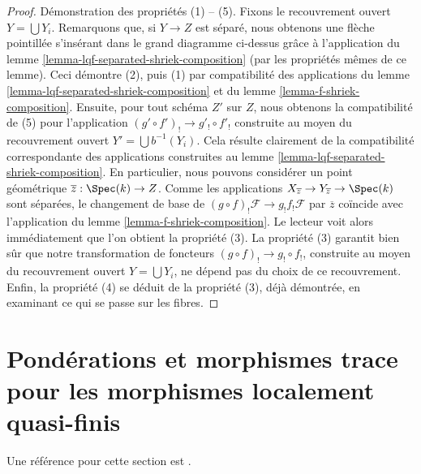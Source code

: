 \begin{proof}
\medskip\noindent
Démonstration des propriétés (1) -- (5). Fixons le recouvrement ouvert $Y = \bigcup Y_i$.
Remarquons que, si $Y \to Z$ est séparé, nous obtenons une flèche pointillée
s'insérant dans le grand diagramme ci-dessus grâce à l'application du
lemme \ref{lemma-lqf-separated-shriek-composition}
(par les propriétés mêmes de ce lemme).
Ceci démontre (2), puis (1) par compatibilité des
applications du lemme \ref{lemma-lqf-separated-shriek-composition}
et du lemme \ref{lemma-f-shriek-composition}.
Ensuite, pour tout schéma $Z'$ sur $Z$, nous obtenons la compatibilité de (5)
pour l'application $(g' \circ f')_! \to g'_! \circ f'_!$
construite au moyen du recouvrement ouvert $Y' = \bigcup b^{-1}(Y_i)$.
Cela résulte clairement de la compatibilité correspondante des applications
construites au lemme \ref{lemma-lqf-separated-shriek-composition}.
En particulier, nous pouvons considérer un point géométrique
$\overline{z} : \Spec(k) \to Z$. Comme les applications
$X_{\overline{z}} \to Y_{\overline{z}} \to \Spec(k)$
sont séparées, le changement de base de
$(g \circ f)_!\mathcal{F} \to g_! f_! \mathcal{F}$
par $\overline{z}$ coïncide avec l'application du
lemme \ref{lemma-f-shriek-composition}.
Le lecteur voit alors immédiatement que l'on obtient la propriété (3).
La propriété (3) garantit bien sûr que notre transformation de foncteurs
$(g \circ f)_! \to g_! \circ f_!$, construite au moyen du recouvrement ouvert
$Y = \bigcup Y_i$, ne dépend pas du choix de ce recouvrement.
Enfin, la propriété (4) se déduit de la propriété (3), déjà démontrée,
en examinant ce qui se passe sur les fibres.
\end{proof}








\section{Pondérations et morphismes trace pour les morphismes localement quasi-finis}
\label{section-weightings}

\noindent
Une référence pour cette section est
\cite[Exposé XVII, Proposition 6.2.5]{SGA4}.

